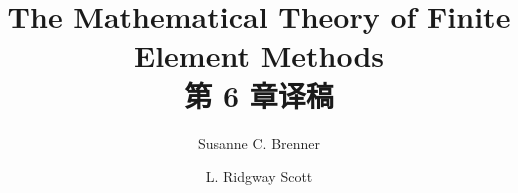 \documentclass[a4paper,UTF8,12pt]{ctexart}
\title{The Mathematical Theory of Finite Element Methods\\第 6 章译稿}
\author{Susanne C. Brenner \and L. Ridgway Scott}
\date{}
\begin{document}
\maketitle
\setcounter{section}{5}
\renewcommand{\thethmcount}{\thesubsection.\arabic{thmcount}}
\renewcommand{\theequation}{\thesubsection.\arabic{equation}}
\renewcommand{\thefigure}{\thesection.\arabic{figure}}
\renewcommand{\thetable}{\thesection.\arabic{table}}

\end{document}
